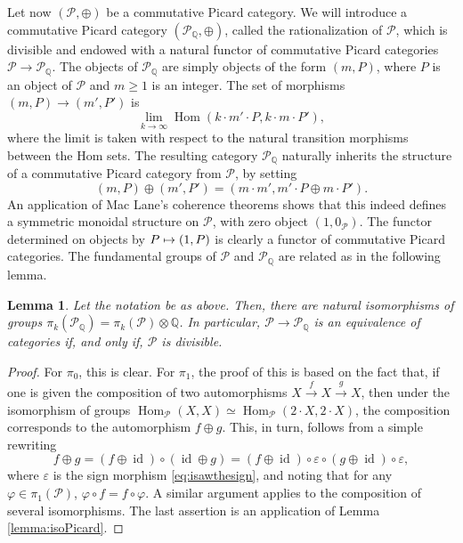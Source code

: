 \documentclass[11pt]{article}
\newcommand\mto{\mathchoice{\longmapsto}{\mapsto}{\mapsto}{\mapsto}}
\theoremstyle{plain}
\newtheorem{lemma}[theorem]{Lemma}
\theoremstyle{definition}
\newcommand{\QBbb}{\mathbb Q}
\newcommand{\Pcal}{\mathcal P}
\DeclareMathOperator{\Hom}{Hom}
\DeclareMathOperator{\id}{id}
\begin{document}
Let now $(\Pcal,\oplus)$ be a commutative Picard category. We will introduce a commutative Picard category $(\Pcal_{\QBbb}, \oplus)$, called the rationalization of $\Pcal$, which is divisible and endowed with a natural functor of commutative Picard categories $\Pcal \to \Pcal_{\QBbb}$. The objects of $\Pcal_{\QBbb}$ are simply objects of the form $(m, P)$, where $P$ is an object of $\Pcal$ and $m\geq 1$ is an integer. The set of morphisms $(m,P) \to (m', P')$ is
\begin{displaymath}
\lim_{k \to \infty} \Hom(k \cdot m'\cdot P, k \cdot m\cdot P'),
\end{displaymath}
where the limit is taken with respect to the natural transition morphisms between the Hom sets. The resulting category $\Pcal_{\QBbb}$ naturally inherits the structure of a commutative Picard category from $\Pcal$, by setting
\begin{displaymath}
(m,P) \oplus (m', P') = (m \cdot m', m' \cdot P \oplus m \cdot P').
\end{displaymath}
An application of Mac Lane's coherence theorems shows that this indeed defines a symmetric monoidal structure on $\Pcal$, with zero object $(1,0_{\Pcal})$. The functor determined on objects by $P \mto (1,P)$ is clearly a functor of commutative Picard categories. The fundamental groups of $\Pcal$ and $\Pcal_{\QBbb}$ are related as in the following lemma.
\begin{lemma}
Let the notation be as above. Then, there are natural isomorphisms of groups $\pi_{k}(\Pcal_{\QBbb})=\pi_{k}(\Pcal)\otimes\QBbb$. In particular, $\Pcal \to \Pcal_\QBbb$ is an equivalence of categories if, and only if, $\Pcal$ is divisible.
\end{lemma}
\begin{proof}
For $\pi_{0}$, this is clear. For $\pi_{1}$, the proof of this is based on the fact that, if one is given the composition of two automorphisms $X \stackrel{f}{\to} X \stackrel{g}{\to} X$, then under the isomorphism of groups $\Hom_{\Pcal}(X, X) \simeq \Hom_{\Pcal} (2\cdot X, 2\cdot X)$, the composition corresponds to the automorphism $f\oplus g$. This, in turn, follows from a simple rewriting\vspace*{-3pt}
\begin{displaymath}
f\oplus g = (f \oplus \id) \circ (\id \oplus g) = (f \oplus \id) \circ \varepsilon \circ (g \oplus \id) \circ \varepsilon,
\end{displaymath}
where $\varepsilon$ is the sign morphism \eqref{eq:isawthesign}, and noting that for any $\varphi \in \pi_1(\Pcal)$, $\varphi \circ f = f \circ \varphi$. A similar argument applies to the composition of several isomorphisms. The last assertion is an application of Lemma \ref{lemma:isoPicard}.
\end{proof}
\end{document}
